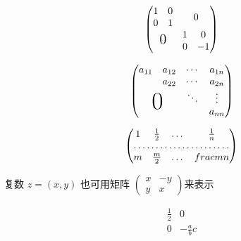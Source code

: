 \documentclass{ctexart}
\begin{document}
    \[
    \begin{pmatrix}
        \begin{matrix} 1&0\\0&1 \end{matrix}
        & \Large 0 \\
        \text{\Large 0} & \begin{matrix}
        1&0\\0&-1 \end{matrix}
    \end{pmatrix}
    \]


    \[\begin{pmatrix}
        a_{11} & a_{12} & \cdots & a_{1n} \\
        & a_{22} & \cdots & a_{2n} \\
        &        & \ddots & \vdots \\
        \multicolumn{2}{c}{\raisebox{1.3ex}[0pt]{\Huge 0}}
        &        & a_{nn}
    \end{pmatrix}\]


    \[
    \begin{pmatrix}
        1 & \frac 12 & \dots & \frac 1n \\
        \hdotsfor{4} \\
        m & \frac m2 & \dots & frac mn
    \end{pmatrix}
    \]


    复数 $z = (x, y)$ 也可用矩阵
    \begin{math}
        \left( %
        \begin{smallmatrix}
            x & -y \\ y & x
        \end{smallmatrix}
        \right) %
    \end{math}来表示


    \[
    \begin{array}{r|r}
        \frac12 & 0 \\
        \hline
        0 & -\frac abc \\
    \end{array}
    \]
\end{document}
